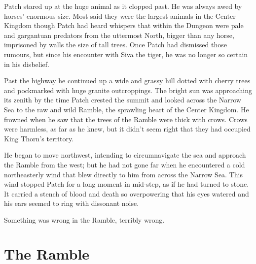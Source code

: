 \documentclass[12pt]{book}
\begin{document}
 Patch stared up at the huge animal as it clopped past. He was always awed by horses' enormous size. Most said they were the largest animals in the Center Kingdom %
 though Patch had heard whispers that within the Dungeon were pale and gargantuan predators from the uttermost North, bigger than any horse, imprisoned by walls the size of tall trees. Once Patch had dismissed those rumours, but since his encounter with Siva the tiger, he was no longer so certain in his disbelief.\par
 Past the highway he continued up a wide and grassy hill dotted with cherry trees and pockmarked with huge granite outcroppings. The bright sun was approaching its zenith by the time Patch crested the summit and looked across the Narrow Sea to the raw and wild Ramble, the sprawling heart of the Center Kingdom. He frowned when he saw that the trees of the Ramble were thick with crows. Crows were harmless, as far as he knew, but it didn't seem right that they had occupied King Thorn's territory. \par
 He began to move northwest, intending to circumnavigate the sea and approach the Ramble from the west; but he had not gone far when he encountered a cold northeasterly wind that blew directly to him from across the Narrow Sea. This wind stopped Patch for a long moment in mid-step, as if he had turned to stone. It carried a stench of blood and death so overpowering that his eyes watered and his ears seemed to ring with dissonant noise.\par
 Something was wrong in the Ramble, terribly wrong.\par

\section{The Ramble}
\end{document}
